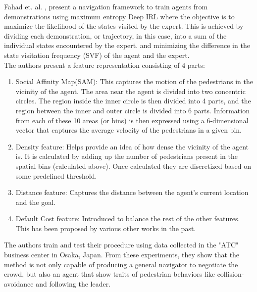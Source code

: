 Fahad et. al. \cite{fahad_learning_2018}, present a navigation framework to train agents from demonstrations using maximum entropy Deep IRL where the objective is to maximize the likelihood of the states visited by the expert.
This is achieved by dividing each demonstration, or trajectory, in this case, into a sum of the individual states encountered by the expert. and minimizing the difference in the state visitation frequency (SVF) of the agent and the expert.\\
The authors present a feature representation consisting of 4 parts:
\begin{enumerate}
    \item Social Affinity Map(SAM): This captures the motion of the pedestrians in the vicinity of the agent. The area near the agent is divided into two concentric circles. The region inside the inner circle is then divided into 4 parts, and the region between the inner and outer circle is divided into 6 parts.
    Information from each of these 10 areas (or bins) is then expressed using a 6-dimensional vector that captures the average velocity of the pedestrians in a given bin. 
    \item Density feature: Helps provide an idea of how dense the vicinity of the agent is. It is calculated by adding up the number of pedestrians present in the spatial bins (calculated above). Once calculated they are discretized based on some predefined threshold.
    \item Distance feature: Captures the distance between the agent's current location and the goal.
    \item Default Cost feature: Introduced to balance the rest of the other features. This has been proposed by various other works in the past.
    
\end{enumerate}
The authors train and test their procedure using data collected in the "ATC" business center in Osaka, Japan.
From these experiments, they show that the method is not only capable of producing a general navigator to negotiate the crowd, but also an agent that show traits of pedestrian behaviors like collision-avoidance and following the leader.


